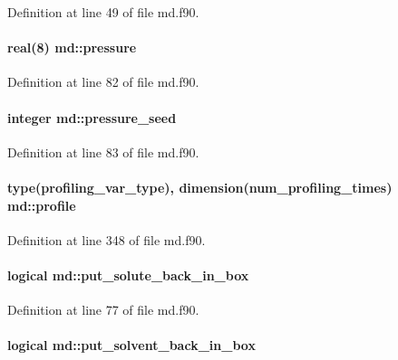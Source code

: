 Definition at line 49 of file md.\-f90.

\hypertarget{classmd_adcfed0a4003cec6e8b5046fd8e48937e}{
\paragraph[{pressure}]{\setlength{\rightskip}{0pt plus 5cm}real(8) md\-::pressure}}\label{classmd_adcfed0a4003cec6e8b5046fd8e48937e}


Definition at line 82 of file md.\-f90.

\hypertarget{classmd_a777487feefbdd6df569b14f8bf8393d8}{
\paragraph[{pressure\-\_\-seed}]{\setlength{\rightskip}{0pt plus 5cm}integer md\-::pressure\-\_\-seed}}\label{classmd_a777487feefbdd6df569b14f8bf8393d8}


Definition at line 83 of file md.\-f90.

\hypertarget{classmd_a8ee40e6aacfacc474ec8a549b8a93ff5}{
\paragraph[{profile}]{\setlength{\rightskip}{0pt plus 5cm}type({\bf profiling\-\_\-var\-\_\-type}), dimension({\bf num\-\_\-profiling\-\_\-times}) md\-::profile}}\label{classmd_a8ee40e6aacfacc474ec8a549b8a93ff5}


Definition at line 348 of file md.\-f90.

\hypertarget{classmd_a5acb428a8473872b05c614e8522dd060}{
\paragraph[{put\-\_\-solute\-\_\-back\-\_\-in\-\_\-box}]{\setlength{\rightskip}{0pt plus 5cm}logical md\-::put\-\_\-solute\-\_\-back\-\_\-in\-\_\-box}}\label{classmd_a5acb428a8473872b05c614e8522dd060}


Definition at line 77 of file md.\-f90.

\hypertarget{classmd_a6b635c744c91b56902713bc6cae1dfae}{
\paragraph[{put\-\_\-solvent\-\_\-back\-\_\-in\-\_\-box}]{\setlength{\rightskip}{0pt plus 5cm}logical md\-::put\-\_\-solvent\-\_\-back\-\_\-in\-\_\-box}}\label{classmd_a6b635c744c91b56902713bc6cae1dfae}


